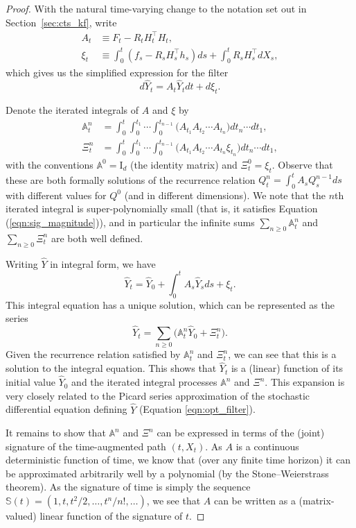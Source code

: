 \documentclass[a4paper, 12pt]{article}
\theoremstyle{remark}
\begin{document}
\begin{proof} With the natural time-varying change to the notation set out in Section~\ref{sec:cts_kf}, write
\begin{align}
A_t &\equiv F_t -R_t H_t^\top H_t,\nonumber\\
\xi_t &\equiv  \int_0^t (f_s - R_s H_s^\top h_s) ds + \int_0^t R_sH_s^\top dX_s, \label{eqn:xi}
 \end{align}
which gives us the simplified expression for the filter
\begin{equation}\label{eq:simplifiedXhat} d\hat Y_t = A_t \hat Y_tdt + d\xi_t.\end{equation}

Denote the iterated integrals of $A$ and $\xi$ by
\begin{align*}
    \mathbb{A}^n_t &= \int_0^t\int_0^{t_1}\cdots\int_0^{t_{n-1}}\Big(A_{t_1}A_{t_2}\cdots A_{t_n}\Big)dt_{n}\cdots dt_1,\\
    \Xi^n_t &= \int_0^t\int_0^{t_1}\cdots\int_0^{t_{n-1}}\Big(A_{t_1}A_{t_2}\cdots A_{t_n}\xi_{t_n}\Big) dt_{n}\cdots dt_1,
\end{align*}
with the conventions $\mathbb{A}^0 =\mathrm{I}_d$ (the identity matrix) and $\Xi^0_t = \xi_t$. Observe that these are both formally solutions of the recurrence relation $Q^n_t = \int_0^t A_s Q^{n-1}_s ds$ with different values for $Q^0$ (and in different dimensions). We note that the $n$th iterated integral is super-polynomially small (that is, it satisfies Equation (\ref{eqn:sig_magnitude})), and in particular the infinite sums $\sum_{n\ge 0} \mathbb{A}^n_t$ and $\sum_{n\ge 0} \Xi^n_t$ are both well defined.


Writing $\hat Y$ in integral form, we have
\[\hat Y_t = \hat Y_0 +\int_0^t A_s \hat Y_s ds + \xi_t.\]
This integral equation has a unique solution, which can be represented as the series
\[\hat Y_t = \sum_{n\ge 0} \Big(\mathbb{A}^n_t \hat Y_0 + \Xi^n_t\Big).\]
Given the recurrence relation satisfied by $\mathbb{A}^n_t$ and $\Xi^n_t$, we can see that this is a solution to the integral equation.
This shows that $\hat Y_t$ is a (linear) function of its initial value $\hat Y_0$ and the iterated integral processes $\mathbb{A}^n$ and $\Xi^n$. This expansion is very closely related to the Picard series approximation of the stochastic differential equation defining $\hat Y$ (Equation \eqref{eqn:opt_filter}). 

It remains to show that $\mathbb{A}^n$ and $\Xi^n$ can be expressed in terms of the (joint) signature of the time-augmented path $(t, X_t)$. As $A$ is a continuous deterministic function of time, we know that (over any finite time horizon) it can be approximated arbitrarily well by a polynomial (by the Stone--Weierstrass theorem). As the signature of time is simply the sequence $\mathbb{S}(t)= (1, t, t^2/2, \dots, t^n/n!,\dots)$, we see that $A$ can be written as a (matrix-valued) linear function of the signature of $t$.


\end{proof}
\end{document}
